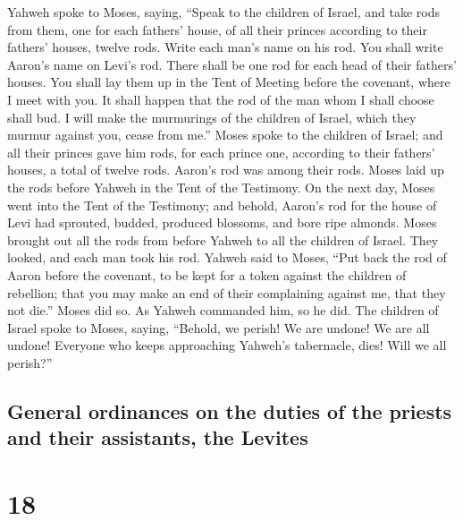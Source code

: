  Yahweh spoke to Moses, saying,  ``Speak to
the children of Israel, and take rods from them, one for each fathers'
house, of all their princes according to their fathers' houses, twelve
rods. Write each man's name on his rod.  You shall write
Aaron's name on Levi's rod. There shall be one rod for each head of
their fathers' houses.  You shall lay them up in the Tent
of Meeting before the covenant, where I meet with you.  It
shall happen that the rod of the man whom I shall choose shall bud. I
will make the murmurings of the children of Israel, which they murmur
against you, cease from me.''  Moses spoke to the children
of Israel; and all their princes gave him rods, for each prince one,
according to their fathers' houses, a total of twelve rods. Aaron's rod
was among their rods.  Moses laid up the rods before
Yahweh in the Tent of the Testimony.  On the next day,
Moses went into the Tent of the Testimony; and behold, Aaron's rod for
the house of Levi had sprouted, budded, produced blossoms, and bore ripe
almonds.  Moses brought out all the rods from before
Yahweh to all the children of Israel. They looked, and each man took his
rod.  Yahweh said to Moses, ``Put back the rod of Aaron
before the covenant, to be kept for a token against the children of
rebellion; that you may make an end of their complaining against me,
that they not die.''  Moses did so. As Yahweh commanded
him, so he did.  The children of Israel spoke to Moses,
saying, ``Behold, we perish! We are undone! We are all undone!
 Everyone who keeps approaching Yahweh's tabernacle,
dies! Will we all perish?''

\hypertarget{general-ordinances-on-the-duties-of-the-priests-and-their-assistants-the-levites}{%
\subsection{General ordinances on the duties of the priests and their
assistants, the
Levites}\label{general-ordinances-on-the-duties-of-the-priests-and-their-assistants-the-levites}}

\hypertarget{section-17}{%
\section{18}\label{section-17}}

